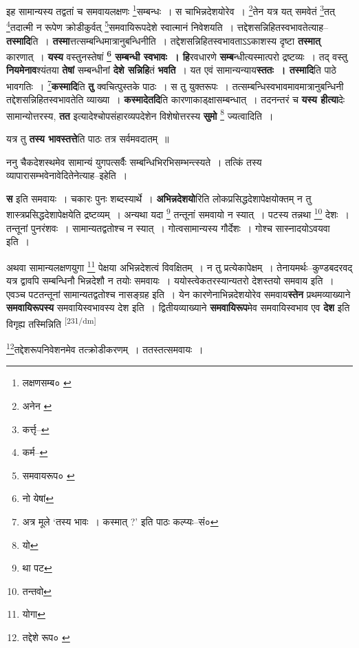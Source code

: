 \documentclass[article,12pt,a4paper]{memoir}
\begin{document}
	इह सामान्यस्य तद्वतां च समवायलक्षणः \footnote{लक्षणसम्ब० \cite{dp-msA}}सम्बन्धः । स चाभिन्नदेशयोरेव । \footnote{अनेन \cite{dp-msB}}तेन यत्र यत् समवेतं \footnote{कर्त्तृ--\cite{dp-msD-n}}तत् \footnote{कर्म--\cite{dp-msD-n}}तदात्मी न रूपेण क्रोडीकुर्वत् \footnote{समवायरूप० \cite{dp-msC}}समवायिरूपदेशे स्वात्मानं निवेशयति । त्तद्देशसन्निहितस्वभावतेत्याह--\textbf{तस्मादि}ति । \textbf{तस्मा}त्तत्सम्बन्धिमात्रानुबन्धिनीति । तद्देशसन्निहितस्वभावताऽऽकाशस्य दृष्टा \textbf{तस्मात्} कारणात् । \textbf{यस्य} वस्तुनस्तेषां \textbf{\footnote{नो येषां} सम्बन्धी स्वभावः । हि}रवधारणे \textbf{सम्ब}न्धीत्यस्मात्परो द्रष्टव्यः । तद् वस्तु \textbf{नियमेनाव}श्यंतया \textbf{तेषां} सम्बन्धीनां \textbf{देशे सन्निहि}तं \textbf{भवति} । यत एवं सामान्यन्याय\textbf{स्ततः । तस्मादि}ति पाठे भावगतिः । \footnote{अत्र मूले ‘तस्य भावः । कस्मात् ?’ इति पाठः कल्प्यः--सं०}\textbf{कस्मादि}ति \textbf{तु} क्वचित्पुस्तके पाठः । स तु युक्तरूपः । तत्सम्बन्धिस्वभावमावमात्रानुबन्धिनी तद्देशसन्निहितस्वभावतेति व्याख्या । \textbf{कस्मादेतदि}ति कारणाकाड्क्षासम्बन्धात् । तदनन्तरं च \textbf{यस्य हीत्या}देः सामान्योत्तरस्य, \textbf{तत} इत्यादेश्चोपसंहारव्यपदेशेन विशेषोत्तरस्य \textbf{सुमो} \footnote{यो} ज्यत्वादिति ।
	\pend
      

	  \pstart यत्र तु \textbf{तस्य भावस्तत्ते}ति पाठः तत्र सर्वमवदातम् ॥
	\pend
      

	  \pstart ननु चैकदेशस्थमेव सामान्यं युगपत्सर्वैः सम्बन्धिभिरभिसम्भन्त्स्यते । तत्किं तस्य व्यापारासम्भवेनावेदितेनेत्याह--इहेति ।
	\pend
      

	  \pstart \textbf{स} इति समवायः । चकारः पुनः शब्दस्यार्थे । \textbf{अभिन्नदेशयो}रिति लोकप्रसिद्धदेशापेक्षयोक्तम् न तु शास्त्रप्रसिद्धदेशापेक्षयेति द्रष्टव्यम् । अन्यथा यदा \footnote{था पट} तन्तूनां समवायो न स्यात् । पटस्य तन्नथा \footnote{तन्तवो} देशः । तन्तूनां पुनरंशवः । सामान्यतद्वतोश्च न स्यात् । गोत्वसामान्यस्य गौर्देशः । गोश्च सास्नादयोऽवयवा इति ।
	\pend
      

	  \pstart अथवा सामान्यलक्षणयुगा \footnote{योगा} पेक्षया अभिन्नदेशत्वं विवक्षितम् । न तु प्रत्येकापेक्षम् । तेनायमर्थः--कुण्डबदरवद् यत्र द्वावपि सम्बन्धिनौ भिन्नदेशौ न तयोः समवायः । ययोस्त्वेकतरस्यान्यतरो देशस्तयो समवाय इति । एवञ्च पटतन्तूनां सामान्यतद्वतोश्च नासङ्ग्रह इति । येन कारणेनाभिन्नदेशयोरेव समवाय\textbf{स्तेन} प्रथमव्याख्याने \textbf{समवायिरूपस्य} समवायिस्वभावस्य देश इति । द्वितीयव्याख्याने \textbf{समवायिरूप}मेव समवायिस्वभाव एव \textbf{देश} इति विगृह्य तस्मिन्निति  \leavevmode\textsuperscript{\rmlatinfont\tiny [231/dm]} 
	  
	\footnote{तद्देशे रूप० \cite{dp-msD}}तद्देशरूपनिवेशनमेव तत्क्रोडीकरणम् । ततस्तत्समवायः । 
	  
\end{document}
